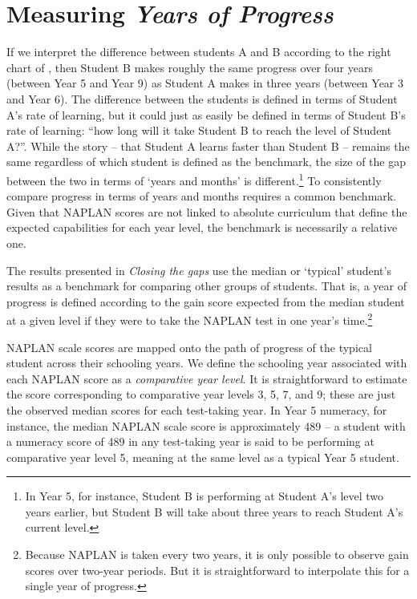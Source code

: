 \section{Measuring \textit{Years of Progress}}

If we interpret the difference between students A and B according to the right chart of , then Student B makes roughly the same progress over four years (between Year 5 and Year 9) as Student A makes in three years (between Year 3 and Year 6). The difference between the students is defined in terms of Student A's rate of learning, but it could just as easily be defined in terms of Student B's rate of learning: ``how long will it take Student B to reach the level of Student A?''. While the story -- that Student A learns faster than Student B -- remains the same regardless of which student is defined as the benchmark, the size of the gap between the two in terms of `years and months' is different.\footnote{In Year 5, for instance, Student B is performing at Student A's level two years earlier, but Student B will take about three years to reach Student A's current level.} To consistently compare progress in terms of years and months requires a common benchmark. Given that NAPLAN scores are not linked to absolute curriculum that define the expected capabilities for each year level, the benchmark is necessarily a relative one.

The results presented in \textit{Closing the gaps} use the median or `typical' student's results as a benchmark for comparing other groups of students. That is, a year of progress is defined according to the gain score expected from the median student at a given level if they were to take the NAPLAN test in one year's time.\footnote{Because NAPLAN is taken every two years, it is only possible to observe gain scores over two-year periods. But it is straightforward to interpolate this for a single year of progress.}

\newpage
NAPLAN scale scores are mapped onto the path of progress of the typical student across their schooling years. We define the schooling year associated with each NAPLAN score as a \textit{comparative year level}. It is straightforward to estimate the score corresponding to comparative year levels 3, 5, 7, and 9; these are just the observed median scores for each test-taking year. In Year 5 numeracy, for instance, the median NAPLAN scale score is approximately 489 -- a student with a numeracy score of 489 in any test-taking year is said to be performing at comparative year level 5, meaning at the same level as a typical Year 5 student.

